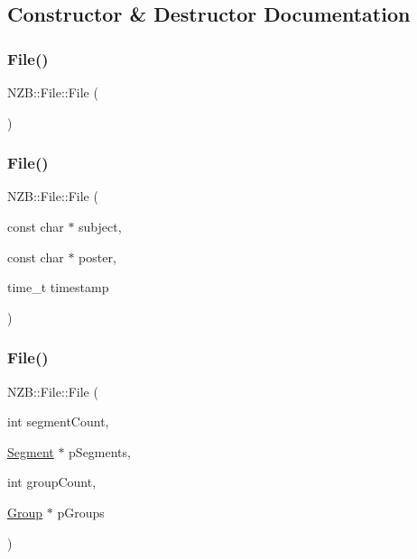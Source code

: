 \subsection{Constructor \& Destructor Documentation}
\hypertarget{class_n_z_b_1_1_file_ac5e08598cb3f05601149485eb02eae7a}{}\label{class_n_z_b_1_1_file_ac5e08598cb3f05601149485eb02eae7a} 
\subsubsection{\texorpdfstring{File()}{File()}\hspace{0.1cm}{\footnotesize\ttfamily [1/4]}}
{\footnotesize\ttfamily N\+Z\+B\+::\+File\+::\+File (\begin{DoxyParamCaption}{ }\end{DoxyParamCaption})\hspace{0.3cm}{\ttfamily [inline]}}

\hypertarget{class_n_z_b_1_1_file_a1d87fa686b8f2cb0c2b8820ef088ba05}{}\label{class_n_z_b_1_1_file_a1d87fa686b8f2cb0c2b8820ef088ba05} 
\subsubsection{\texorpdfstring{File()}{File()}\hspace{0.1cm}{\footnotesize\ttfamily [2/4]}}
{\footnotesize\ttfamily N\+Z\+B\+::\+File\+::\+File (\begin{DoxyParamCaption}\item[{const char $\ast$}]{subject,  }\item[{const char $\ast$}]{poster,  }\item[{time\+\_\+t}]{timestamp }\end{DoxyParamCaption})}

\hypertarget{class_n_z_b_1_1_file_af83c62781c50d7cc8e1808234920b8a6}{}\label{class_n_z_b_1_1_file_af83c62781c50d7cc8e1808234920b8a6} 
\subsubsection{\texorpdfstring{File()}{File()}\hspace{0.1cm}{\footnotesize\ttfamily [3/4]}}
{\footnotesize\ttfamily N\+Z\+B\+::\+File\+::\+File (\begin{DoxyParamCaption}\item[{int}]{segment\+Count,  }\item[{\hyperlink{class_n_z_b_1_1_segment}{Segment} $\ast$}]{p\+Segments,  }\item[{int}]{group\+Count,  }\item[{\hyperlink{class_n_z_b_1_1_group}{Group} $\ast$}]{p\+Groups }\end{DoxyParamCaption})}

